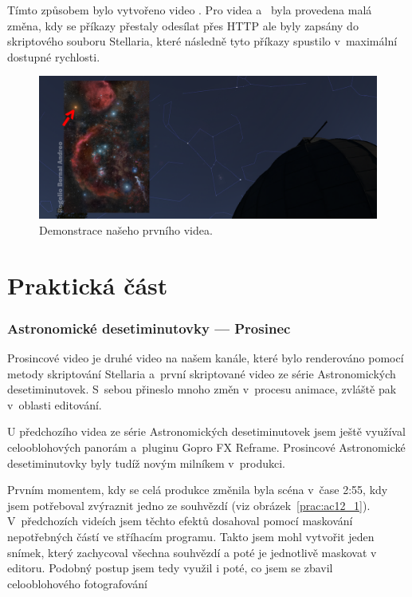 \documentclass[12pt,a4paper,titlepage]{article}
\begin{document}
Tímto způsobem bylo vytvořeno video . Pro videa  a~ byla provedena malá změna, kdy se příkazy přestaly odesílat přes HTTP ale byly zapsány do skriptového souboru Stellaria, které následně tyto příkazy spustilo v~maximální dostupné rychlosti.
\begin{figure}[ht]
	\centering
	\includegraphics[width=.85\textwidth]{unor.png}
	\caption{Demonstrace našeho prvního videa.}\label{img:unor}
\end{figure}
\newpage
\part{Praktická část}
\section{Astronomické desetiminutovky --- Prosinec}
Prosincové video je druhé video na našem kanále, které bylo renderováno pomocí metody skriptování Stellaria a~první skriptované video ze série Astronomických desetiminutovek. S~sebou přineslo mnoho změn v~procesu animace, zvláště pak v~oblasti editování. 

U předchozího videa ze série Astronomických desetiminutovek jsem ještě využíval celooblohových panorám a~pluginu Gopro FX Reframe. Prosincové Astronomické desetiminutovky byly tudíž novým milníkem v~produkci.

Prvním momentem, kdy se celá produkce změnila byla scéna v~čase 2:55, kdy jsem potřeboval zvýraznit jedno ze souhvězdí (viz obrázek~\ref{prac:ac12_1}). V~předchozích videích jsem těchto efektů dosahoval pomocí maskování nepotřebných částí ve stříhacím programu. Takto jsem mohl vytvořit jeden snímek, který zachycoval všechna souhvězdí a poté je jednotlivě maskovat v editoru. Podobný postup jsem tedy využil i poté, co jsem se zbavil celooblohového fotografování
\end{document}
